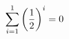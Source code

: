 \documentclass[preview]{standalone}
\begin{document}
\begin{align*}
\sum_{i=1}^{ 1 } \left({ 1 } \over {2} \right)^i = { 0 }
\end{align*}
\end{document}
